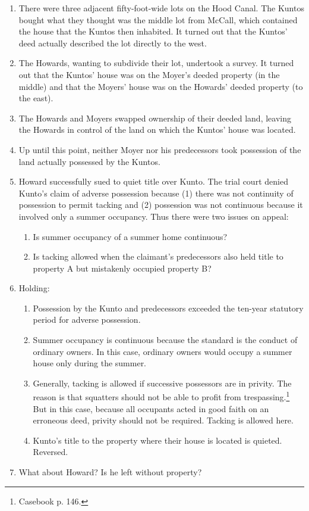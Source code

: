 \begin{enumerate}
    \item There were three adjacent fifty-foot-wide lots on the Hood Canal. 
    The Kuntos bought what they thought was the middle lot from McCall, which 
    contained the house that the Kuntos then inhabited. It turned out that the 
    Kuntos' deed actually described the lot directly 
    to the west.
    \item The Howards, wanting to subdivide their lot, undertook a survey. It 
    turned out that the Kuntos' house was on the Moyer's deeded property (in the 
    middle) and that the Moyers' house was on the Howards' deeded property (to 
    the east).
    \item The Howards and Moyers swapped ownership of their deeded land, 
    leaving the Howards in control of the land on which the Kuntos' house was 
    located.
    \item Up until this point, neither Moyer nor his predecessors took 
    possession of the land actually possessed by the Kuntos.
    \item Howard successfully sued to quiet title over Kunto. The trial court 
    denied Kunto's claim of adverse possession because (1) there was not 
    continuity of possession to permit tacking and (2) possession was not 
    continuous because it involved only a summer occupancy. Thus there were 
    two issues on appeal:
    \begin{enumerate}
        \item Is summer occupancy of a summer home continuous?
        \item Is tacking allowed when the claimant's predecessors also held 
        title to property A but mistakenly occupied property B?
    \end{enumerate}
    \item Holding:
    \begin{enumerate}
        \item Possession by the Kunto and predecessors exceeded the ten-year 
        statutory period for adverse possession.
        \item Summer occupancy is continuous because the standard is the 
        conduct of ordinary owners. In this case, ordinary owners would occupy 
        a summer house only during the summer.
        \item Generally, tacking is allowed if successive possessors are in 
        privity. The reason is that squatters should not be able to profit 
        from trespassing.\footnote{Casebook p. 146.} But in this case, because 
        all occupants acted in good faith on an erroneous deed, privity should 
        not be required. Tacking is allowed here.
        \item Kunto's title to the property where their house is located is 
        quieted. Reversed.
    \end{enumerate}
    \item What about Howard? Is he left without property?
\end{enumerate}

